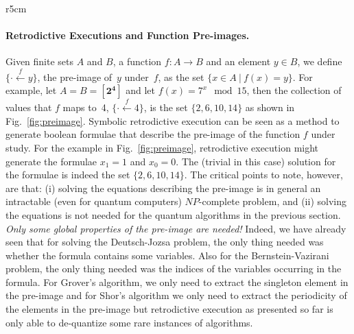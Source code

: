 \documentclass{article}
\newcommand{\preim}[2]{\{\cdot\stackrel{#1}{\longleftarrow}{#2}\}}
\newcommand{\finset}[1]{[\mathbf{#1}]}
\begin{document}
\begin{refsection}
\begin{wrapfigure}{r}{5cm}
\begin{center}
\end{center}
\caption{\label{fig:preimage}The pre-image of 4 under $f(x) = 7^x \mod 15$.}
\end{wrapfigure}
\paragraph*{Retrodictive Executions and Function Pre-images.}
Given finite sets $A$ and $B$, a function $f : A \rightarrow B$ and an
element $y \in B$, we define $\preim{f}{y}$, the pre-image of~$y$
under~$f$, as the set $\{ x \in A ~|~ f(x) = y \}$. For example, let
$A = B = \finset{2^4}$ and let $f(x) = 7^x \mod 15$, then the
collection of values that $f$ maps to~4, $\preim{f}{4}$, is the set
$\{ 2, 6, 10, 14 \}$ as shown in Fig.~\ref{fig:preimage}. Symbolic
retrodictive execution can be seen as a method to generate boolean
formulae that describe the pre-image of the function $f$ under
study. For the example in Fig.~\ref{fig:preimage}, retrodictive
execution might generate the formulae $x_1=1$ and $x_0=0$. The
(trivial in this case) solution for the formulae is indeed the set $\{
2, 6, 10, 14 \}$. The critical points to note, however, are that: (i)
solving the equations describing the pre-image is in general an
intractable (even for quantum computers) $\mathit{NP}$-complete
problem, and (ii) solving the equations is not needed for the quantum
algorithms in the previous section. \emph{Only some global properties
  of the pre-image are needed!} Indeed, we have already seen that for
solving the Deutsch-Jozsa problem, the only thing needed was whether
the formula contains some variables. Also for the Bernstein-Vazirani
problem, the only thing needed was the indices of the variables
occurring in the formula. For Grover's algorithm, we only need to
extract the singleton element in the pre-image and for Shor's
algorithm we only need to extract the periodicity of the elements in
the pre-image but retrodictive execution as presented so far is only
able to de-quantize some rare instances of algorithms.


\end{refsection}
\end{document}
